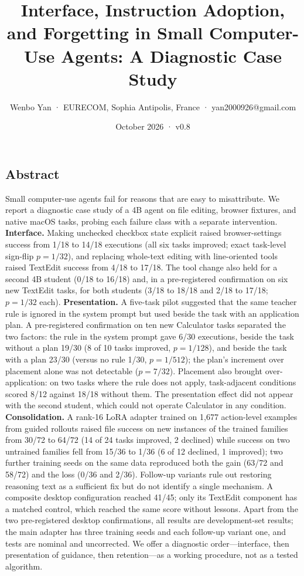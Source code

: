 \documentclass[
  10pt,
]{article}
\title{Interface, Instruction Adoption, and Forgetting in Small
Computer-Use Agents: A Diagnostic Case Study}
\author{Wenbo Yan · EURECOM, Sophia Antipolis, France ·
yan2000926@gmail.com}
\date{October 2026 · v0.8}
\begin{document}
\maketitle

\subsection{Abstract}\label{abstract}

Small computer-use agents fail for reasons that are easy to
misattribute. We report a diagnostic case study of a 4B agent on file
editing, browser fixtures, and native macOS tasks, probing each failure
class with a separate intervention. \textbf{Interface.} Making unchecked
checkbox state explicit raised browser-settings success from 1/18 to
14/18 executions (all six tasks improved; exact task-level sign-flip
\(p=1/32\)), and replacing whole-text editing with line-oriented tools
raised TextEdit success from 4/18 to 17/18. The tool change also held
for a second 4B student (0/18 to 16/18) and, in a pre-registered
confirmation on six new TextEdit tasks, for both students (3/18 to 18/18
and 2/18 to 17/18; \(p=1/32\) each). \textbf{Presentation.} A five-task
pilot suggested that the same teacher rule is ignored in the system
prompt but used beside the task with an application plan. A
pre-registered confirmation on ten new Calculator tasks separated the
two factors: the rule in the system prompt gave 6/30 executions, beside
the task without a plan 19/30 (8 of 10 tasks improved, \(p=1/128\)), and
beside the task with a plan 23/30 (versus no rule 1/30, \(p=1/512\));
the plan's increment over placement alone was not detectable
(\(p=7/32\)). Placement also brought over-application: on two tasks
where the rule does not apply, task-adjacent conditions scored 8/12
against 18/18 without them. The presentation effect did not appear with
the second student, which could not operate Calculator in any condition.
\textbf{Consolidation.} A rank-16 LoRA adapter trained on 1,677
action-level examples from guided rollouts raised file success on new
instances of the trained families from 30/72 to 64/72 (14 of 24 tasks
improved, 2 declined) while success on two untrained families fell from
15/36 to 1/36 (6 of 12 declined, 1 improved); two further training seeds
on the same data reproduced both the gain (63/72 and 58/72) and the loss
(0/36 and 2/36). Follow-up variants rule out restoring reasoning text as
a sufficient fix but do not identify a single mechanism. A composite
desktop configuration reached 41/45; only its TextEdit component has a
matched control, which reached the same score without lessons. Apart
from the two pre-registered desktop confirmations, all results are
development-set results; the main adapter has three training seeds and
each follow-up variant one, and tests are nominal and uncorrected. We
offer a diagnostic order---interface, then presentation of guidance,
then retention---as a working procedure, not as a tested algorithm.
\end{document}
